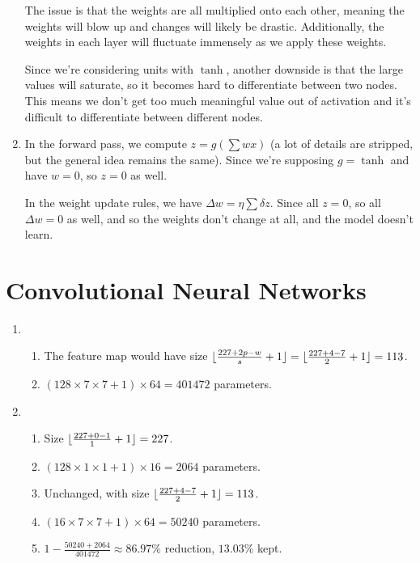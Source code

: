 \begin{enumerate}
	      The issue is that the weights are all multiplied onto each other, meaning the weights will blow up and changes will likely be drastic.
	      Additionally, the weights in each layer will fluctuate immensely as we apply these weights.

	      Since we're considering units with $\tanh$, another downside is that the large values will saturate, so it becomes hard to differentiate between two nodes.
	      This means we don't get too much meaningful value out of activation and it's difficult to differentiate between different nodes.

	\item
	      In the forward pass, we compute $z = g(\sum wx)$ (a lot of details are stripped, but the general idea remains the same).
	      Since we're supposing $g = \tanh$ and have $w = 0$, so $z = 0$ as well.

	      In the weight update rules, we have $\Delta w = \eta \sum \delta z$.
	      Since all $z = 0$, so all $\Delta w = 0$ as well, and so the weights don't change at all,
	      and the model doesn't learn.

\end{enumerate}


\newpage
\section{Convolutional Neural Networks}

\begin{enumerate}[label=(\alph*)]
	\item
	      \begin{enumerate}[label=(\roman*)]
		      \item The feature map would have size $\lfloor\frac{227 + 2p - w}{s} + 1\rfloor = \lfloor\frac{227 + 4 - 7}{2} + 1\rfloor = 113$.
		      \item $(128 \times 7 \times 7 + 1) \times 64 = 401472$ parameters.
	      \end{enumerate}
	\item
	      \begin{enumerate}[label=(\roman*)]
		      \item Size $\lfloor\frac{227 + 0 - 1}{1} + 1\rfloor = 227$.
		      \item $(128 \times 1 \times 1 + 1) \times 16 = 2064$ parameters.
		      \item Unchanged, with size $\lfloor\frac{227 + 4 - 7}{2} + 1\rfloor = 113$.
		      \item $(16 \times 7 \times 7 + 1) \times 64 = 50240$ parameters.
		      \item $1 - \frac{50240 + 2064}{401472} \approx 86.97\%$ reduction, $13.03\%$ kept.
	      \end{enumerate}
\end{enumerate}

